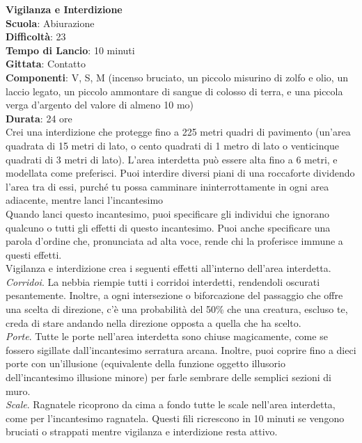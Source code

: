 \begin{multicols}{2}
\medskip\textbf{Vigilanza e Interdizione}\\
\textbf{Scuola}: Abiurazione\\
\textbf{Difficoltà}:  23\\
\textbf{Tempo di Lancio}: 10 minuti\\
\textbf{Gittata}: Contatto\\
\textbf{Componenti}: V, S, M (incenso bruciato, un piccolo misurino di zolfo e olio, un laccio legato, un piccolo ammontare di sangue di colosso di terra, e una piccola verga d'argento del valore di almeno 10 mo)\\
\textbf{Durata}: 24 ore\\
Crei una interdizione che protegge fino a 225 metri quadri di pavimento (un'area quadrata di 15 metri di lato, o cento quadrati di 1 metro di lato o venticinque quadrati di 3 metri di lato). L'area interdetta può essere alta fino a 6 metri, e modellata come preferisci. Puoi interdire diversi piani di una roccaforte dividendo l'area tra di essi, purché tu possa camminare ininterrottamente in ogni area adiacente, mentre lanci l'incantesimo\\
Quando lanci questo incantesimo, puoi specificare gli individui che ignorano qualcuno o tutti gli effetti di questo incantesimo. Puoi anche specificare una parola d'ordine che, pronunciata ad alta voce, rende chi la proferisce immune a questi effetti.\\
Vigilanza e interdizione crea i seguenti effetti all'interno dell'area interdetta.\\
\textit{Corridoi}. La nebbia riempie tutti i corridoi interdetti, rendendoli oscurati pesantemente. Inoltre, a ogni intersezione o biforcazione del passaggio che offre una scelta di direzione, c'è una probabilità del 50\% che una creatura, escluso te, creda di stare andando nella direzione opposta a quella che ha scelto.\\
\textit{Porte}. Tutte le porte nell'area interdetta sono chiuse magicamente, come se fossero sigillate dall'incantesimo serratura arcana. Inoltre, puoi coprire fino a dieci porte con un'illusione (equivalente della funzione oggetto illusorio dell'incantesimo illusione minore) per farle sembrare delle semplici sezioni di muro.\\
\textit{Scale}. Ragnatele ricoprono da cima a fondo tutte le scale nell'area interdetta, come per l'incantesimo ragnatela. Questi fili ricrescono in 10 minuti se vengono bruciati o strappati mentre vigilanza e interdizione resta attivo.\\

\end{multicols}
